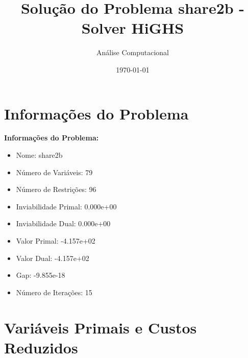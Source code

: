 \documentclass[12pt]{article}
\title{Solução do Problema share2b - Solver HiGHS}
\author{Análise Computacional}
\date{\today}
\begin{document}
\maketitle

\section{Informações do Problema}

\textbf{Informações do Problema:}
\begin{itemize}
\item Nome: share2b
\item Número de Variáveis: 79
\item Número de Restrições: 96
\item Inviabilidade Primal: 0.000e+00
\item Inviabilidade Dual: 0.000e+00
\item Valor Primal: -4.157e+02
\item Valor Dual: -4.157e+02
\item Gap: -9.855e-18
\item Número de Iterações: 15
\end{itemize}


\section{Variáveis Primais e Custos Reduzidos}
\end{document}
